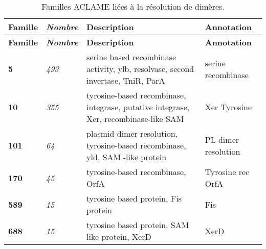 \begin{longtable}{ >{\bfseries\small}p{}| >{\itshape\small}p{} >{\small}p{} | >{\small}p{}}
 \caption{Familles ACLAME liées à la résolution de dimères.}\\
{\normalsize\bf Famille} & {\normalsize\bf Nombre} & {\normalsize\bf Description} & {\normalsize\bf Annotation}\\
\endfirsthead
{\normalsize\bf Famille} & {\normalsize\bf Nombre} & {\normalsize\bf Description} & {\normalsize\bf Annotation}\\
\endhead
5 & 493 & serine based recombinase activity, ylb, resolvase, second invertase, TniR, ParA & serine recombinase\\
10 & 355 & tyrosine-based recombinase, integrase, putative integrase, Xer, recombinase-like SAM & Xer Tyrosine\\
101 & 64 & plasmid dimer resolution, tyrosine-based recombinase, yld, SAM|-like protein & PL dimer resolution\\
170 & 45 & tyrosine-based recombinase, OrfA & Tyrosine rec OrfA\\
589 & 15 & tyrosine based protein, Fis protein & Fis\\
688 & 15 & tyrosine based protein, SAM like protein, XerD & XerD\\
\end{longtable}

